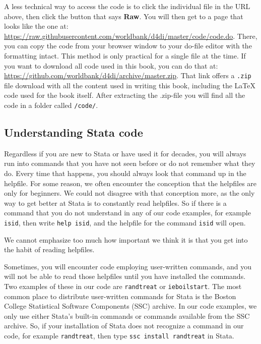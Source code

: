 A less technical way to access the code is to click the individual file in the URL above, then click
the button that says \textbf{Raw}. You will then get to a page that looks like the one at:
\url{https://raw.githubusercontent.com/worldbank/d4di/master/code/code.do}.
There, you can copy the code from your browser window to your do-file editor with the formatting intact.
This method is only practical for a single file at the time.
If you want to download all code used in this book, you can do that at:
\url{https://github.com/worldbank/d4di/archive/master.zip}. That link offers a \texttt{.zip} file download
with all the content used in writing this book, including the \LaTeX{} code used for the book itself. After
extracting the .zip-file you will find all the code in a folder called \texttt{/code/}.

\subsection{Understanding Stata code}

Regardless if you are new to Stata or have used it for decades, you will always run into commands that
you have not seen before or do not remember what they do. Every time that happens, you should always look
that command up in the helpfile. For some reason, we often encounter the conception that the helpfiles
are only for beginners. We could not disagree with that conception more, as the only way to get better at Stata
is to constantly read helpfiles. So if there is a command that you do not understand in any of our code
examples, for example \texttt{isid}, then write \texttt{help isid}, and the helpfile for the command \texttt{isid} will open.

We cannot emphasize too much how important we think it is that you get into the habit of reading helpfiles.

Sometimes, you will encounter code employing user-written commands,
and you will not be able to read those helpfiles until you have installed the commands.
Two examples of these in our code are \texttt{randtreat} or \texttt{ieboilstart}.
The most common place to distribute user-written commands for Stata is the Boston College Statistical Software Components
(SSC) archive. In our code examples, we only use either Stata's built-in commands or commands available from the
SSC archive. So, if your installation of Stata does not recognize a command in our code, for example
\texttt{randtreat}, then type \texttt{ssc install randtreat} in Stata.

